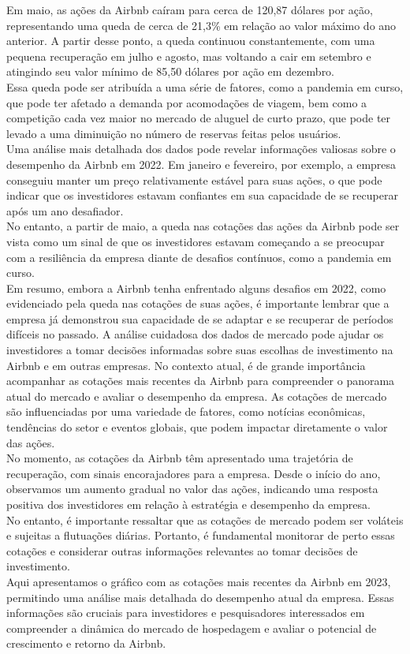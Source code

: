 \documentclass{article}
\begin{document}
Em maio, as ações da Airbnb caíram para cerca de 120,87 dólares por ação, representando uma queda de cerca de 21,3\% em relação ao valor máximo do ano anterior. A partir desse ponto, a queda continuou constantemente, com uma pequena recuperação em julho e agosto, mas voltando a cair em setembro e atingindo seu valor mínimo de 85,50 dólares por ação em dezembro.\\
Essa queda pode ser atribuída a uma série de fatores, como a pandemia em curso, que pode ter afetado a demanda por acomodações de viagem, bem como a competição cada vez maior no mercado de aluguel de curto prazo, que pode ter levado a uma diminuição no número de reservas feitas pelos usuários.\\
Uma análise mais detalhada dos dados pode revelar informações valiosas sobre o desempenho da Airbnb em 2022. Em janeiro e fevereiro, por exemplo, a empresa conseguiu manter um preço relativamente estável para suas ações, o que pode indicar que os investidores estavam confiantes em sua capacidade de se recuperar após um ano desafiador. \\
No entanto, a partir de maio, a queda nas cotações das ações da Airbnb pode ser vista como um sinal de que os investidores estavam começando a se preocupar com a resiliência da empresa diante de desafios contínuos, como a pandemia em curso.\\
Em resumo, embora a Airbnb tenha enfrentado alguns desafios em 2022, como evidenciado pela queda nas cotações de suas ações, é importante lembrar que a empresa já demonstrou sua capacidade de se adaptar e se recuperar de períodos difíceis no passado. A análise cuidadosa dos dados de mercado pode ajudar os investidores a tomar decisões informadas sobre suas escolhas de investimento na Airbnb e em outras empresas.
\newpage
No contexto atual, é de grande importância acompanhar as cotações mais recentes da Airbnb para compreender o panorama atual do mercado e avaliar o desempenho da empresa. As cotações de mercado são influenciadas por uma variedade de fatores, como notícias econômicas, tendências do setor e eventos globais, que podem impactar diretamente o valor das ações. \\
No momento, as cotações da Airbnb têm apresentado uma trajetória de recuperação, com sinais encorajadores para a empresa. Desde o início do ano, observamos um aumento gradual no valor das ações, indicando uma resposta positiva dos investidores em relação à estratégia e desempenho da empresa. \\
No entanto, é importante ressaltar que as cotações de mercado podem ser voláteis e sujeitas a flutuações diárias. Portanto, é fundamental monitorar de perto essas cotações e considerar outras informações relevantes ao tomar decisões de investimento. \\
Aqui apresentamos o gráfico com as cotações mais recentes da Airbnb em 2023, permitindo uma análise mais detalhada do desempenho atual da empresa. Essas informações são cruciais para investidores e pesquisadores interessados em compreender a dinâmica do mercado de hospedagem e avaliar o potencial de crescimento e retorno da Airbnb.
\end{document}
